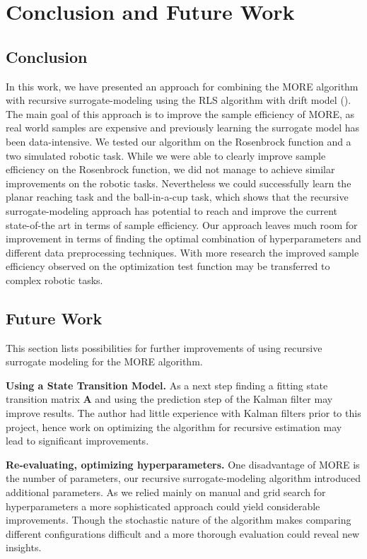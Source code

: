 
\chapter{Conclusion and Future Work}


\section{Conclusion}
In this work, we have presented an approach for combining the MORE algorithm
\citep{abdolmaleki2015model} with recursive surrogate-modeling
using the RLS algorithm with drift model ().
The main goal of this approach is to improve the sample efficiency of
MORE, as real world samples are expensive and
previously learning the surrogate model has been data-intensive.
We tested our algorithm on the Rosenbrock function and
a two simulated robotic task.
While we were able to clearly improve sample efficiency on the Rosenbrock
function, we did not manage to achieve similar
improvements on the robotic tasks.
Nevertheless we could successfully learn the planar reaching task and
the ball-in-a-cup task,
which shows that the recursive surrogate-modeling approach has
potential to reach and improve the current state-of-the art in terms
of sample efficiency.
Our approach leaves much room for improvement in terms of finding
the optimal combination of hyperparameters and different data
preprocessing techniques.
With more research the improved sample efficiency observed
on the optimization test function may be transferred to
complex robotic tasks.

\section{Future Work}
This section lists possibilities for further improvements of using
recursive surrogate modeling for the MORE algorithm.

\textbf{Using a State Transition Model.}
As a next step finding a fitting state transition matrix $\mathbf{A}$ and
using the prediction step of the Kalman filter may improve results. 
The author had little experience with Kalman filters prior
to this project, hence work on optimizing the algorithm for
recursive estimation may lead to significant improvements.

\textbf{Re-evaluating, optimizing hyperparameters.}
One disadvantage of MORE is the number of parameters, our
recursive surrogate-modeling algorithm introduced additional parameters.
As we relied mainly on manual and grid search for hyperparameters a
more sophisticated approach could yield considerable improvements.
Though the stochastic nature of the algorithm makes comparing
different configurations difficult and a more thorough evaluation
could reveal new insights.

